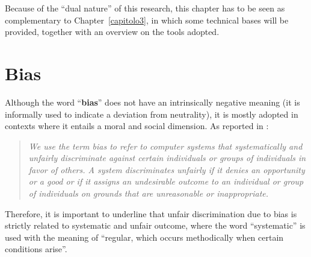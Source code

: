 Because of the ``dual nature'' of this research, this chapter has to be seen as complementary to Chapter~\ref{capitolo3}, in which some technical bases will be provided, together with an overview on the tools adopted.


\section{Bias}
\label{section:bias}
Although the word ``\textbf{bias}'' does not have an intrinsically negative meaning (it is informally used to indicate a deviation from neutrality), it is mostly adopted in contexts where it entails a moral and social dimension. As reported in \cite{friedman2017bias}:
\begin{quote}\emph{We use the term bias to refer to computer systems that \emph{systematically} and \emph{unfairly discriminate} against certain individuals or groups of individuals in favor of others. A system discriminates unfairly if it denies an opportunity or a good or if it assigns an undesirable outcome to an individual or group of individuals on grounds that are unreasonable or inappropriate.} \cite[p.~332]{friedman2017bias}\end{quote}
Therefore, it is important to underline that unfair discrimination due to bias is strictly related to systematic and unfair outcome, where the word ``systematic'' is used with the meaning of ``regular, which occurs methodically when certain conditions arise''.

